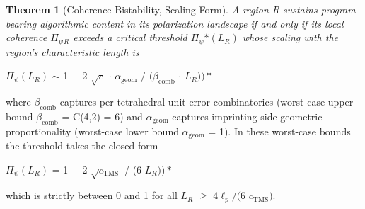 \documentclass[11pt,oneside]{report}
\newtheorem{theorem}{Theorem}[section]
\theoremstyle{definition}
\theoremstyle{remark}
\begin{document}
\begin{theorem}[Coherence Bistability, Scaling Form]
A region R sustains
program-bearing algorithmic content in its polarization landscape if and
only if its local coherence \textbar \ensuremath{\Pi_{\psi}}\textbar\ensuremath{_{R}} exceeds a critical
threshold \textbar \ensuremath{\Pi_{\psi}}\textbar\ensuremath{*(L_{R})} whose scaling with the region's
characteristic length is
\end{theorem}

\emph{\textbar \ensuremath{\Pi_{\psi}}\textbar{}}\ensuremath{(L_{R})} \ensuremath{\sim} 1 \ensuremath{-} 2 \ensuremath{\sqrt{c}} \ensuremath{\cdot} \ensuremath{\alpha_{\mathrm{geom}}} / \ensuremath{(\beta_{\mathrm{comb}}} \ensuremath{\cdot}
\ensuremath{L_{R}))*}

where \ensuremath{\beta_{\mathrm{comb}}} captures per-tetrahedral-unit error combinatorics
(worst-case upper bound \ensuremath{\beta_{\mathrm{comb}}} = C(4,2) = 6) and \ensuremath{\alpha_{\mathrm{geom}}} captures
imprinting-side geometric proportionality (worst-case lower bound
\ensuremath{\alpha_{\mathrm{geom}}} = 1). In these worst-case bounds the threshold takes the closed
form

\emph{\textbar \ensuremath{\Pi_{\psi}}\textbar{}}\ensuremath{(L_{R})} = 1 \ensuremath{-} 2 \ensuremath{\sqrt{c_{\mathrm{TMS}}}} / (6 \ensuremath{L_{R}))*}

which is strictly between 0 and 1 for all \ensuremath{L_{R}} \ensuremath{\geq} \ensuremath{4\ell_{p}/(6} \ensuremath{c_{\mathrm{TMS}}).}
\end{document}
